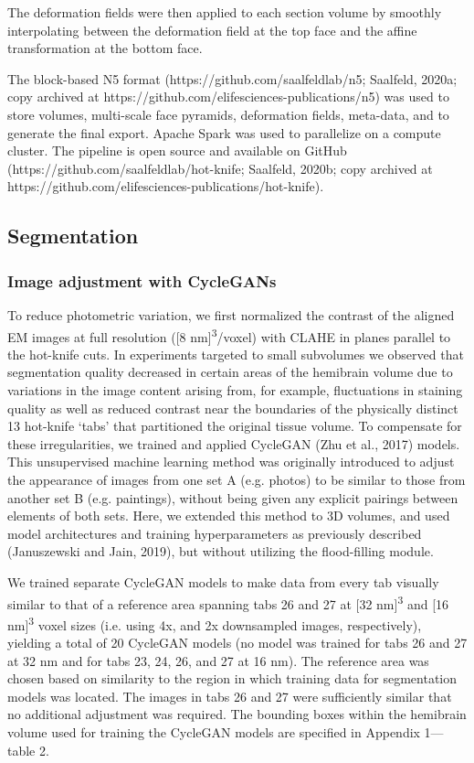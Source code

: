 \documentclass{article}
\begin{document}
The deformation fields were then applied to each section volume by smoothly interpolating between the deformation field at the top face and the affine transformation at the bottom face.

The block-based N5 format (https://github.com/saalfeldlab/n5; Saalfeld, 2020a; copy archived at https://github.com/elifesciences-publications/n5) was used to store volumes, multi-scale face pyramids, deformation fields, meta-data, and to generate the final export. Apache Spark was used to parallelize on a compute cluster. The pipeline is open source and available on GitHub (https://github.com/saalfeldlab/hot-knife; Saalfeld, 2020b; copy archived at https://github.com/elifesciences-publications/hot-knife).

\subsection*{Segmentation}

\subsubsection*{Image adjustment with CycleGANs}

To reduce photometric variation, we first normalized the contrast of the aligned EM images at full resolution ([8 nm]\textsuperscript{3}/voxel) with CLAHE in planes parallel to the hot-knife cuts. In experiments targeted to small subvolumes we observed that segmentation quality decreased in certain areas of the hemibrain volume due to variations in the image content arising from, for example, fluctuations in staining quality as well as reduced contrast near the boundaries of the physically distinct 13 hot-knife ‘tabs’ that partitioned the original tissue volume. To compensate for these irregularities, we trained and applied CycleGAN (Zhu et al., 2017) models. This unsupervised machine learning method was originally introduced to adjust the appearance of images from one set A (e.g. photos) to be similar to those from another set B (e.g. paintings), without being given any explicit pairings between elements of both sets. Here, we extended this method to 3D volumes, and used model architectures and training hyperparameters as previously described (Januszewski and Jain, 2019), but without utilizing the flood-filling module.

We trained separate CycleGAN models to make data from every tab visually similar to that of a reference area spanning tabs 26 and 27 at [32 nm]\textsuperscript{3} and [16 nm]\textsuperscript{3} voxel sizes (i.e. using 4x, and 2x downsampled images, respectively), yielding a total of 20 CycleGAN models (no model was trained for tabs 26 and 27 at 32 nm and for tabs 23, 24, 26, and 27 at 16 nm). The reference area was chosen based on similarity to the region in which training data for segmentation models was located. The images in tabs 26 and 27 were sufficiently similar that no additional adjustment was required. The bounding boxes within the hemibrain volume used for training the CycleGAN models are specified in Appendix 1—table 2.
\end{document}

